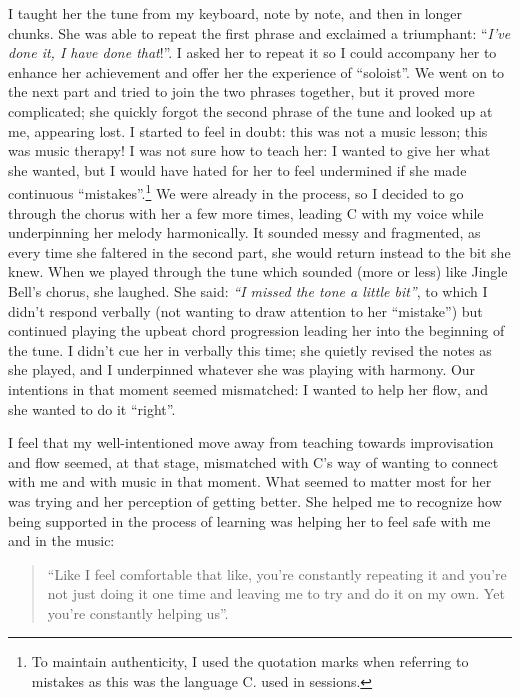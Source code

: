 \documentclass[authordate, empirical, issue]{jote-new-article}
\begin{document}
I taught her the tune from my keyboard, note by note, and then in longer chunks. She was able to repeat the first phrase and exclaimed a triumphant: “\emph{I've done it, I have done that}!”. I asked her to repeat it so I could accompany her to enhance her achievement and offer her the experience of “soloist”. We went on to the next part and tried to join the two phrases together, but it proved more complicated; she quickly forgot the second phrase of the tune and looked up at me, appearing lost. I started to feel in doubt: this was not a music lesson; this was music therapy! I was not sure how to teach her: I wanted to give her what she wanted, but I would have hated for her to feel undermined if she made continuous “mistakes”.\footnote{ To maintain authenticity, I used the quotation marks when referring to mistakes as this was the language C. used in sessions.} We were already in the process, so I decided to go through the chorus with her a few more times, leading C with my voice while underpinning her melody harmonically. It sounded messy and fragmented, as every time she faltered in the second part, she would return instead to the bit she knew. When we played through the tune which sounded (more or less) like Jingle Bell's chorus, she laughed. She said: \emph{“I missed the tone a little bit”}, to which I didn't respond verbally (not wanting to draw attention to her “mistake”) but continued playing the upbeat chord progression leading her into the beginning of the tune. I didn't cue her in verbally this time; she quietly revised the notes as she played, and I underpinned whatever she was playing with harmony. Our intentions in that moment seemed mismatched: I wanted to help her flow, and she wanted to do it “right”.







I feel that my well-intentioned move away from teaching towards improvisation and flow seemed, at that stage, mismatched with C's way of wanting to connect with me and with music in that moment. What seemed to matter most for her was trying\emph{ }and her perception of getting better. She helped me to recognize how being supported in the process of learning was helping her to feel safe with me and in the music:







\begin{quote}
  “Like I feel comfortable that like, you're constantly repeating it and you're not just doing it one time and leaving me to try and do it on my own. Yet you're constantly helping us”.
\end{quote}
\end{document}
